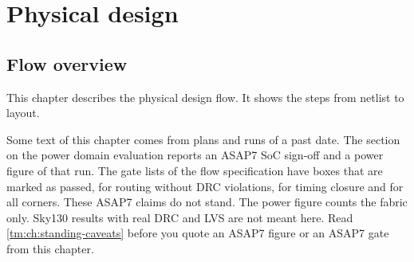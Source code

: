 \part{Physical design}\label{tm:part:physical-design}

\chapter{Flow overview}\label{tm:ch:flow-overview}

This chapter describes the physical design flow. It shows the steps from netlist to layout.

\begin{information}
Some text of this chapter comes from plans and runs of a past date. The section on the power domain evaluation reports an ASAP7 SoC sign-off and a power figure of that run. The gate lists of the flow specification have boxes that are marked as passed, for routing without DRC violations, for timing closure and for all corners. These ASAP7 claims do not stand. The power figure counts the fabric only. Sky130 results with real DRC and LVS are not meant here. Read \cref{tm:ch:standing-caveats} before you quote an ASAP7 figure or an ASAP7 gate from this chapter.
\end{information}

